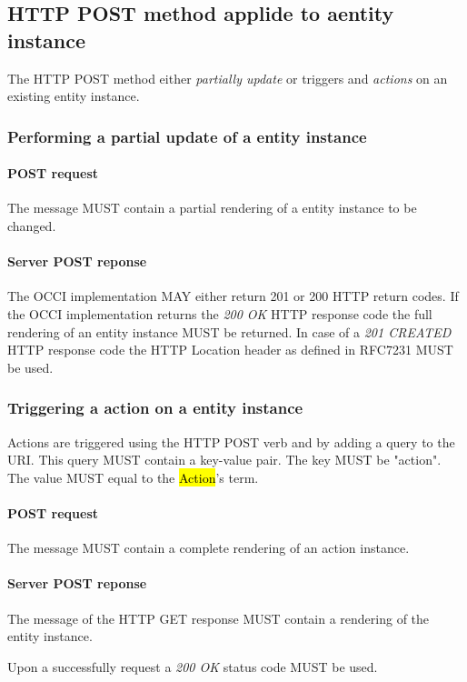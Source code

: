\documentclass[10pt,a4paper]{article}
\begin{document}
\subsection{HTTP POST method applide to aentity instance}
The HTTP POST method either {\em partially update} or triggers and {\em actions} on an existing entity instance.

\subsubsection{Performing a partial update of a entity instance}

\paragraph{POST request}
The message MUST contain a partial rendering of a entity instance to be changed.

\paragraph{Server POST reponse}
The OCCI implementation MAY either return 201 or 200 HTTP return codes. If the OCCI implementation
returns the \emph{200 OK} HTTP response code the full rendering of an entity instance MUST be returned. 
In case of a \emph{201 CREATED} HTTP response code the HTTP Location header as defined in RFC7231 \cite{rfc7231} MUST be used.

\subsubsection{Triggering a action on a entity instance}
Actions are triggered using the HTTP POST verb and by adding a query to the URI. This query MUST contain a key-value pair. The key MUST be "action". The value MUST equal to the \hl{Action}'s term.

\paragraph{POST request}
The message MUST contain a complete rendering of an action instance.

\paragraph{Server POST reponse}
The message of the HTTP GET response MUST contain a rendering of the entity instance.

Upon a successfully request a \emph{200 OK} status code MUST be used.
\end{document}
